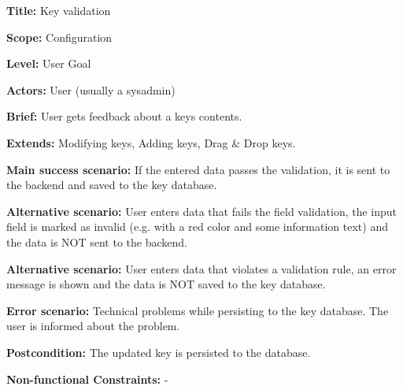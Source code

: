 
\begin{DoxyItemize}
\item {\bfseries Title\+:} Key validation
\item {\bfseries Scope\+:} Configuration
\item {\bfseries Level\+:} User Goal
\item {\bfseries Actors\+:} User (usually a sysadmin)
\item {\bfseries Brief\+:} User gets feedback about a key\textquotesingle{}s contents.
\end{DoxyItemize}


\begin{DoxyItemize}
\item {\bfseries Extends\+:} Modifying keys, Adding keys, Drag \& Drop keys.
\item {\bfseries Main success scenario\+:} If the entered data passes the validation, it is sent to the backend and saved to the key database.
\item {\bfseries Alternative scenario\+:} User enters data that fails the field validation, the input field is marked as invalid (e.\+g. with a red color and some information text) and the data is N\+OT sent to the backend.
\item {\bfseries Alternative scenario\+:} User enters data that violates a validation rule, an error message is shown and the data is N\+OT saved to the key database.
\item {\bfseries Error scenario\+:} Technical problems while persisting to the key database. The user is informed about the problem.
\item {\bfseries Postcondition\+:} The updated key is persisted to the database.
\item {\bfseries Non-\/functional Constraints\+:} -\/ 
\end{DoxyItemize}